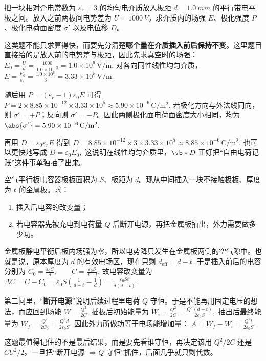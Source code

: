 \documentclass[lang=cn,11pt]{elegantbook}
\begin{document}
\begin{exercise}
把一块相对介电常数为 \(\varepsilon_r=3\) 的均匀电介质放入板距 \(d=\SI{1.0}{mm}\) 的平行带电平板之间。放入之前两板间电势差为 \(U=\SI{1000}{V}\)。求介质内的场强 \(E\)、极化强度 \(P\)、极化电荷面密度 \(\sigma'\) 以及电位移 \(D\)。
\end{exercise}

\begin{solution}
这类题不能只求算得快，而要先分清楚\textbf{哪个量在介质插入前后保持不变}。这里题目直接给的是放入前的电势差与板距，因此先求真空时的场强：
 \(E_0=\frac{U}{d} =\frac{1000}{1.0\times 10^{-3}} =1.0\times 10^6\,\mathrm{V/m}.\) 
对各向同性线性均匀介质，
 \(E=\frac{E_0}{\varepsilon_r} =\frac{1.0\times 10^6}{3} =3.33\times 10^5\,\mathrm{V/m}.\) 

随后用
 \(P=(\varepsilon_r-1)\varepsilon_0E\) 
可得
 \(P=2\times 8.85\times 10^{-12}\times 3.33\times 10^5 \approx 5.90\times 10^{-6}\,\mathrm{C/m^2}.\) 
若极化方向与外法线同向，则 \(\sigma'=+P\)；反向则 \(\sigma'=-P\)。因此两侧极化面电荷面密度大小相同，均为
 \(\abs{\sigma'}=5.90\times 10^{-6}\,\mathrm{C/m^2}.\) 

再用
 \(D=\varepsilon_0\varepsilon_rE\) 
得到
 \(D=8.85\times 10^{-12}\times 3\times 3.33\times 10^5 \approx 8.85\times 10^{-6}\,\mathrm{C/m^2}.\) 
也可以更快地写成
 \(D=\varepsilon_0E_0,\) 
这说明在线性均匀介质里，\(\vb*{D}\) 正好把“自由电荷记账”这件事单独抽了出来。
\end{solution}

\begin{exercise}[插入金属板后电容与做功怎样变化]
空气平行板电容器极板面积为 \(S\)、板距为 \(d\)。现从中间插入一块不接触极板、厚度为 \(t\) 的金属板。求：
\begin{enumerate}
 \item 插入后电容的改变量；
 \item 若电容器先被充电到电荷量 \(Q\) 后断开电源，再把金属板抽出，外力需要做多少功。
\end{enumerate}
\end{exercise}

\begin{solution}
金属板静电平衡后板内场强为零，所以电势降只发生在金属板两侧的空气隙中。也就是说，原本厚度为 \(d\) 的有效电场区，现在只剩
 \(d_{\mathrm{eff}}=d-t.\) 
于是插入前后的电容分别为
 \(C_0=\frac{\varepsilon_0S}{d}, \qquad C=\frac{\varepsilon_0S}{d-t}.\) 
故电容改变量为
 \(\Delta C=C-C_0 =\varepsilon_0S\left(\frac{1}{d-t}-\frac{1}{d}\right) =\frac{\varepsilon_0St}{d(d-t)}.\) 

第二问里，“\textbf{断开电源}”说明后续过程里电荷 \(Q\) 守恒。于是不能再用固定电压的想法，而应回到场能
 \(W=\frac{Q^2}{2C}.\) 
插板后初始能量为
 \(W_i=\frac{Q^2}{2C} =\frac{Q^2(d-t)}{2\varepsilon_0S},\) 
抽出后最终能量为
 \(W_f=\frac{Q^2}{2C_0} =\frac{Q^2d}{2\varepsilon_0S}.\) 
因此外力所做功等于电场能增加量：
 \(A=W_f-W_i =\frac{Q^2t}{2\varepsilon_0S}.\) 

这题最值得记住的不是最后结果，而是要先看谁守恒，再决定该用 \(Q^2/2C\) 还是 \(CU^2/2\)。一旦把“断开电源 \(\Rightarrow Q\) 守恒”抓住，后面几乎就只剩代数。
\end{solution}
\end{document}

